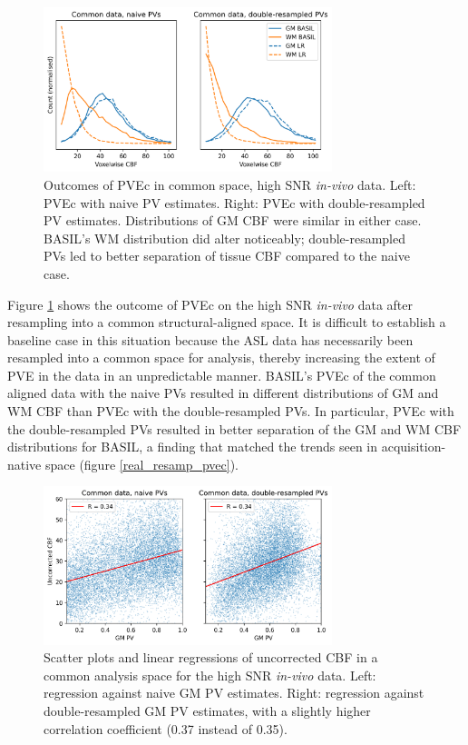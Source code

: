 \documentclass[12pt]{report}
\begin{document}
\begin{figure}[H]
\centering
\includegraphics[width = 0.75\textwidth]{real_highsnr_pvec_cmn.png}
\caption{Outcomes of PVEc in common space, high SNR \textit{in-vivo} data. Left: PVEc with naive PV estimates. Right: PVEc with double-resampled PV estimates. Distributions of GM CBF were similar in either case. BASIL's WM distribution did alter noticeably;  double-resampled PVs led to better separation of tissue CBF compared to the naive case.}
\label{real_highsnr_pvec_cmn}
\end{figure}

Figure \ref{real_highsnr_pvec_cmn} shows the outcome of PVEc on the high SNR \textit{in-vivo} data after resampling into a common structural-aligned space. It is difficult to establish a baseline case in this situation because the ASL data has necessarily been resampled into a common space for analysis, thereby increasing the extent of PVE in the data in an unpredictable manner. BASIL's PVEc of the common aligned data with the naive PVs resulted in different distributions of GM and WM CBF than PVEc with the double-resampled PVs. In particular, PVEc with the double-resampled PVs resulted in better separation of the GM and WM CBF distributions for BASIL, a finding that matched the trends seen in acquisition-native space (figure \ref{real_resamp_pvec}).

\begin{figure}[H]
\centering
\includegraphics[width = 0.75\textwidth]{real_highsnr_scatter_cmn.png}
\caption{Scatter plots and linear regressions of uncorrected CBF in a common analysis space for the high SNR \textit{in-vivo} data. Left: regression against naive GM PV estimates. Right: regression against double-resampled GM PV estimates, with a slightly higher correlation coefficient (0.37 instead of 0.35).}
\label{real_highsnr_scatter_cmn}
\end{figure}
\end{document}
